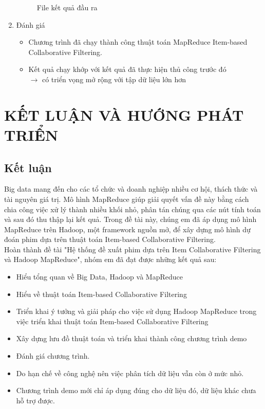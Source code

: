 \documentclass{report}
\begin{document}
\begin{enumerate}
\begin{figure}[ht]
              \caption{File kết quả đầu ra}
          \end{figure}
    \item Đánh giá
          \begin{itemize}
              \item Chương trình đã chạy thành công thuật toán MapReduce Item-based Collaborative Filtering.
              \item Kết quả chạy khớp với kết quả đã thực hiện thủ công trước đó \\ $\rightarrow$ có triển vọng mở rộng với tập dữ liệu lớn hơn
          \end{itemize}
\end{enumerate}


\chapter[KẾT LUẬN VÀ HƯỚNG PHÁT TRIỂN]
 {\LARGE KẾT LUẬN VÀ HƯỚNG PHÁT TRIỂN}

\section{Kết luận}
Big data mang đến cho các tổ chức và doanh nghiệp nhiều cơ hội, thách thức và tài nguyên
giá trị. Mô hình MapReduce giúp giải quyết vấn đề này bằng cách chia công việc xử lý thành
nhiều khối nhỏ, phân tán chúng qua các nút tính toán và sau đó thu thập lại kết quả.
Trong đề tài này, chúng em đã áp dụng mô hình MapReduce trên Hadoop, một framework nguồn mở,
để xây dựng mô hình dự đoán phim dựa trên thuật toán Item-based Collaborative Filtering. \\
\vspace{0.5cm}
Hoàn thành đề tài "Hệ thống đề xuất phim dựa trên Item Collaborative Filtering và Hadoop MapReduce",
nhóm em đã đạt được những kết quả sau:
\begin{itemize}
    \item Hiểu tổng quan về Big Data, Hadoop và MapReduce
    \item Hiểu về thuật toán Item-based Collaborative Filtering
    \item Triển khai ý tưởng và giải pháp cho việc sử dụng Hadoop MapReduce
          trong việc triển khai thuật toán Item-based Collaborative Filtering
    \item Xây dựng lưu đồ thuật toán và triển khai thành công chương trình demo
    \item Đánh giá chương trình.
    \item Do hạn chế về công nghệ nên việc phân tích dữ liệu vẫn còn ở mức nhỏ.
    \item Chương trình demo mới chỉ áp dụng đúng cho dữ liệu đó, dữ liệu khác chưa hỗ trợ được.
\end{itemize}
\end{document}
